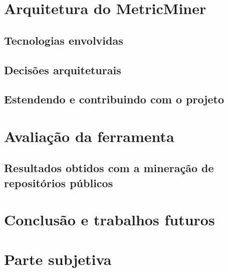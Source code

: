 \documentclass[a4paper, 12pt, twoside]{book}
\begin{document}
\chapter{Arquitetura do MetricMiner} \label{ch:arquitetura}

    \section{Tecnologias envolvidas}
    
    \section{Decisões arquiteturais}
    
    \section{Estendendo e contribuindo com o projeto}
    
\chapter{Avaliação da ferramenta} \label{ch:avaliacao}

    \section{Resultados obtidos com a mineração de repositórios públicos}

\chapter{Conclusão e trabalhos futuros} \label{ch:conclusao}

\chapter{Parte subjetiva} \label{ch:subjetiva}



\end{document}
